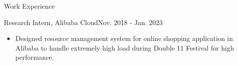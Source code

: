 \documentclass{resume} %
\begin{document}
\begin{rSection}{Work Experience}
\vspace{-0.5em}
\begin{rSubsection}{Research Intern, Alibaba Cloud}{Nov. 2018 - Jan. 2023}{}{}
\item[] 
\begin{itemize}
    \setlength{\itemsep}{0.2em}
    \setlength{\parskip}{0pt}
\item Designed resource management system for online shopping application in Alibaba to handle extremely high load during Double 11 Festival for high performance.
\end{itemize}
\end{rSubsection}
\end{rSection}
\vspace{-1em}

\end{document}
